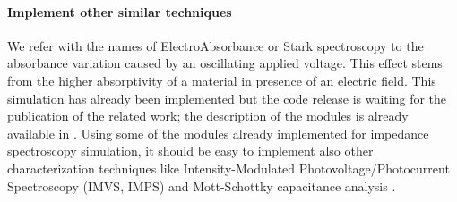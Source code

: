 \paragraph{Implement other similar techniques}
We refer with the names of ElectroAbsorbance or Stark spectroscopy to the absorbance variation caused by an oscillating applied voltage.
This effect stems from the higher absorptivity of a material in presence of an electric field.
This simulation has already been implemented but the code release is waiting for the publication of the related work; the description of the modules is already available in .
Using some of the modules already implemented for impedance spectroscopy simulation, it should be easy to implement also other characterization techniques like Intensity-Modulated Photovoltage/Photocurrent Spectroscopy (IMVS, IMPS) \cite{Pockett2015,Guillen2014} and Mott-Schottky capacitance analysis \cite{Almora2016}.



